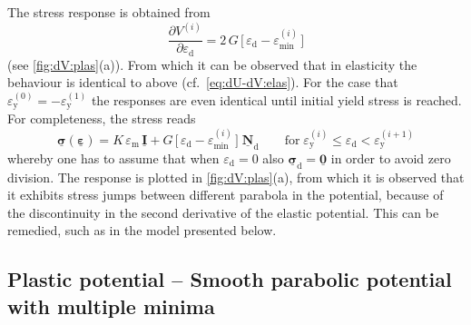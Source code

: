 \documentclass[namecite, fleqn]{goose-article}
\newcommand\T[1]{\underline{\bm{{#1}}}}
\begin{document}
The stress response is obtained from
\begin{equation}
    \label{eq:dV-plas}
    \frac{\partial V^{(i)}}{\partial \varepsilon_\mathrm{d}}
    =
    2 \, G \, \Big[\, \varepsilon_\mathrm{d} - \varepsilon_\mathrm{min}^{(i)} \,\Big]
\end{equation}
(see \cref{fig:dV:plas}(a)).
From which it can be observed that in elasticity the behaviour is identical to above
(cf.~\cref{eq:dU-dV:elas}).
For the case that $\varepsilon_\mathrm{y}^{(0)} = - \varepsilon_\mathrm{y}^{(1)}$ the
responses are even identical until initial yield stress is reached.
For completeness, the stress reads
\begin{equation}
    \T{\sigma} ( \T{\varepsilon} )
    =
    K \, \varepsilon_\mathrm{m} \, \T{I}
    +
    G \, \Big[\, \varepsilon_\mathrm{d} - \varepsilon_\mathrm{min}^{(i)} \,\Big] \;
    \T{N}_\mathrm{d}
    \qquad
    \mathrm{for}
    \;
    \varepsilon_\mathrm{y}^{(i)} \leq \varepsilon_\mathrm{d} < \varepsilon_\mathrm{y}^{(i+1)}
\end{equation}
whereby one has to assume that when $\varepsilon_\mathrm{d} = 0$ also
$\T{\sigma}_\mathrm{d} = \T{0}$ in order to avoid zero division.
The response is plotted in \cref{fig:dV:plas}(a),
from which it is observed that it exhibits stress jumps between different parabola in the potential,
because of the discontinuity in the second derivative of the elastic potential.
This can be remedied, such as in the model presented below.

\subsection{Plastic potential -- Smooth parabolic potential with multiple minima}
\end{document}
